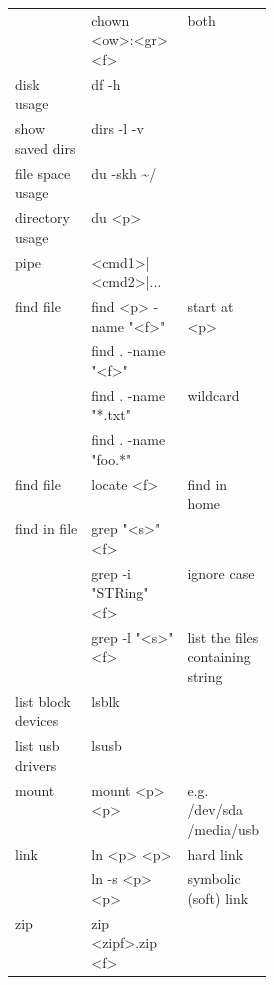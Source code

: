 {\begin{tabularx}{\linewidth}{@{} l>{\ttfamily}lp{0.3\linewidth} @{}}
                             & chown <ow>:<gr> <f>        & both                             \\
        disk usage           & df -h                      &                                  \\
        show saved dirs      & dirs -l -v                 &                                  \\
        file space usage     & du -skh \textasciitilde{}/ &                                  \\
        directory usage      & du <p>                     &                                  \\
        pipe                 & <cmd1>|<cmd2>|...          &                                  \\
        find file            & find <p> -name "<f>"       & start at <p>                     \\
                             & find . -name "<f>"         &                                  \\
                             & find . -name "*.txt"       & wildcard                         \\
                             & find . -name "foo.*"       &                                  \\
        find file            & locate <f>                 & find in home                     \\
        find in file         & grep "<s>" <f>             &                                  \\
                             & grep -i "STRing" <f>       & ignore case                      \\
                             & grep -l "<s>" <f>          & list the files containing string \\
        list block devices   & lsblk                      &                                  \\
        list usb drivers     & lsusb                      &                                  \\
        mount                & mount <p> <p>              & e.g. /dev/sda /media/usb         \\
        link                 & ln <p> <p>                 & hard link                        \\
                             & ln -s <p> <p>              & symbolic (soft) link             \\
        zip                  & zip <zipf>.zip <f>         &                                  \\

\end{tabularx}}
